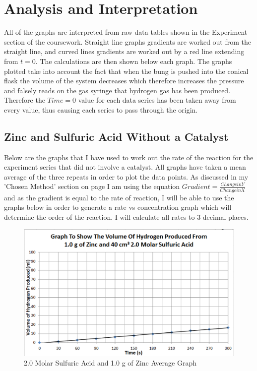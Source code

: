 \chapter {Analysis and Interpretation} 



All of the graphs are interpreted from raw data tables shown in the Experiment section of the coursework. Straight line graphs gradients are worked out from the straight line, and curved lines gradients are worked out by a red line extending from $t = 0$. The calculations are then shown below each graph. The graphs plotted take into account the fact that when the bung is pushed into the conical flask the volume of the system decreases which therefore increases the pressure and falsely reads on the gas syringe that hydrogen gas has been produced. Therefore the $Time = 0$ value for each data series has been taken away from every value, thus causing each series to pass through the origin.

\section{Zinc and Sulfuric Acid Without a Catalyst} 

Below are the graphs that I have used to work out the rate of the reaction for the experiment series that did not involve a catalyst. All graphs have taken a mean average of the three repeats in order to plot the data points. As discussed in my 'Chosen Method' section on page \pageref{Chosen Method} I am using the equation $Gradient = \frac{Change in Y}{Change in X}$ and as the gradient is equal to the rate of reaction, I will be able to use the graphs below in order to generate a rate vs concentration graph which will determine the order of the reaction. I will calculate all rates to 3 decimal places.

\begin{figure}[H]
    \includegraphics[width=\textwidth]{./Analysis/Images/1NonCatalyst/2Molar.pdf}
    \caption{2.0 Molar Sulfuric Acid and 1.0 g of Zinc Average Graph} \label{fig:2MolarSAGradient}
\end{figure}

